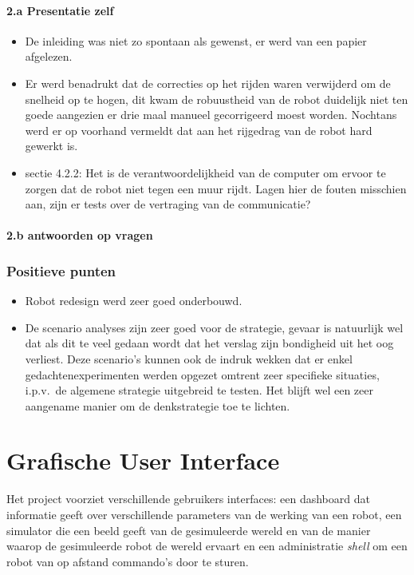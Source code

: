 \documentclass[12pt,a4paper]{report}
\begin{document}
	\subsubsection{2.a Presentatie zelf}
\begin{itemize}
	\item De inleiding was niet zo spontaan als gewenst, er werd van een papier afgelezen.
	\item Er werd benadrukt dat de correcties op het rijden waren verwijderd om de snelheid op te hogen, dit kwam de robuustheid van de robot duidelijk niet ten goede aangezien er drie maal manueel gecorrigeerd moest worden. Nochtans werd er op voorhand vermeldt dat aan het rijgedrag van de robot hard gewerkt is.
	\item sectie 4.2.2: Het is de verantwoordelijkheid van de computer om ervoor te zorgen dat de robot niet tegen een muur rijdt. Lagen hier de fouten misschien aan, zijn er tests over de vertraging van de communicatie?
\end{itemize}
     \subsubsection{2.b antwoorden op vragen}
\subsection{ Positieve punten}
\begin{itemize}
	\item Robot redesign werd zeer goed onderbouwd.
	\item De scenario analyses zijn zeer goed voor de strategie, gevaar is natuurlijk wel dat als dit te veel gedaan wordt dat het verslag zijn bondigheid uit het oog verliest. Deze scenario's kunnen ook de indruk wekken dat er enkel gedachtenexperimenten werden opgezet omtrent zeer specifieke situaties, i.p.v.\ de algemene strategie uitgebreid te testen. Het blijft wel een zeer aangename manier om de denkstrategie toe te lichten.
\end{itemize}
 
\chapter{Grafische User Interface}

Het project voorziet verschillende gebruikers interfaces: een dashboard dat informatie geeft over verschillende parameters van de werking van een robot, een simulator die een beeld geeft van de gesimuleerde wereld en van de manier waarop de gesimuleerde robot de wereld ervaart en een administratie \emph{shell} om een robot van op afstand commando's door te sturen.
\end{document}
